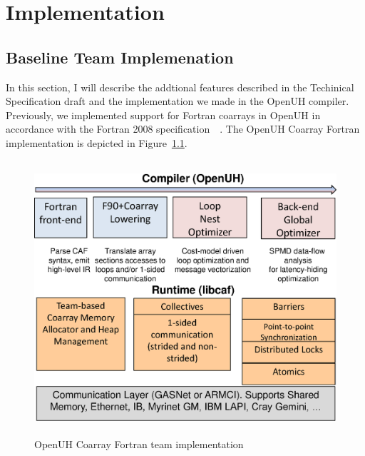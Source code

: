 \chapter{Implementation}\label{chap:Algorithms}
\section{Baseline Team Implemenation} 
In this section, I will describe the addtional features described in the Techinical Specification draft and the implementation we made in the OpenUH compiler. 
Previously, we implemented support for Fortran coarrays in OpenUH in accordance with the Fortran 2008
specification~\cite{EachempatiCoarray2013}~\cite{EachempatiCAF2010}.  The OpenUH Coarray Fortran implementation is depicted in Figure~\ref{fig:teams-openuh}.  

\begin{figure}[!h]
\centering
\includegraphics[width=5in, height=4in]{figures/uh-coarrays-implementation-stack.eps}
\caption{OpenUH Coarray Fortran team implementation}
\label{fig:teams-openuh}
\end{figure}


